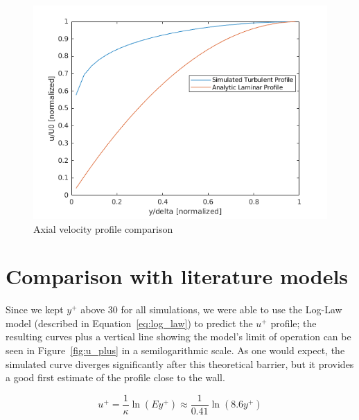 \documentclass[12pt]{article}
\begin{document}
        \begin{figure}
                \centering
                \includegraphics[width=\textwidth]{Axial_Velocities.png}
                \caption{Axial velocity profile comparison}
                \label{fig:axialV}
        \end{figure}

\section{Comparison with literature models} \label{sec:literature}

        Since we kept \( y^+ \) above 30 for all simulations, we were able to use the Log-Law model (described in Equation~\ref{eq:log_law}) to predict the \( u^+ \) profile; the resulting curves plus a vertical line showing the model's limit of operation can be seen in Figure~\ref{fig:u_plus} in a semilogarithmic scale. As one would expect, the simulated curve diverges significantly after this theoretical barrier, but it provides a good first estimate of the profile close to the wall.

        \begin{equation} \label{eq:log_law}
                u^+ = \frac{1}{\kappa} \ln(E y^+) \approx \frac{1}{0.41} \ln(8.6y^+)
        \end{equation}
        
\end{document}
